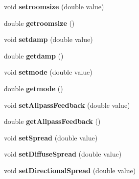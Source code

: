 \begin{DoxyCompactItemize}
\item 
\hypertarget{class_freeverb_a901a83127cfa8c424cf21e5ca04e6452}{void {\bfseries setroomsize} (double value)}\label{class_freeverb_a901a83127cfa8c424cf21e5ca04e6452}

\item 
\hypertarget{class_freeverb_a4bc7df1e748137cc43cbdf24b2bfbad1}{double {\bfseries getroomsize} ()}\label{class_freeverb_a4bc7df1e748137cc43cbdf24b2bfbad1}

\item 
\hypertarget{class_freeverb_a9145740308baa361b65aec2b194d0946}{void {\bfseries setdamp} (double value)}\label{class_freeverb_a9145740308baa361b65aec2b194d0946}

\item 
\hypertarget{class_freeverb_a387e1a190b52eae5b826af43ed736921}{double {\bfseries getdamp} ()}\label{class_freeverb_a387e1a190b52eae5b826af43ed736921}

\item 
\hypertarget{class_freeverb_a12cdf4f59a4ef2ca1ba3b2ce1c79bf5c}{void {\bfseries setmode} (double value)}\label{class_freeverb_a12cdf4f59a4ef2ca1ba3b2ce1c79bf5c}

\item 
\hypertarget{class_freeverb_a65b4185a2c9fc29073346186f13cfb9e}{double {\bfseries getmode} ()}\label{class_freeverb_a65b4185a2c9fc29073346186f13cfb9e}

\item 
\hypertarget{class_freeverb_aae97fb7195924eb79d51b21ad156fdf8}{void {\bfseries set\-Allpass\-Feedback} (double value)}\label{class_freeverb_aae97fb7195924eb79d51b21ad156fdf8}

\item 
\hypertarget{class_freeverb_a846640ad90542d86246b6827c5b1bfee}{double {\bfseries get\-Allpass\-Feedback} ()}\label{class_freeverb_a846640ad90542d86246b6827c5b1bfee}

\item 
\hypertarget{class_freeverb_ae22eb2fac0fb0caa38a2337918ab3192}{void {\bfseries set\-Spread} (double value)}\label{class_freeverb_ae22eb2fac0fb0caa38a2337918ab3192}

\item 
\hypertarget{class_freeverb_a96b732e8b5f4cb318960f4e1c9c7cf61}{void {\bfseries set\-Diffuse\-Spread} (double value)}\label{class_freeverb_a96b732e8b5f4cb318960f4e1c9c7cf61}

\item 
\hypertarget{class_freeverb_ae40290ed1c46c4e0410a0da007629546}{void {\bfseries set\-Directional\-Spread} (double value)}\label{class_freeverb_ae40290ed1c46c4e0410a0da007629546}


\end{DoxyCompactItemize}
